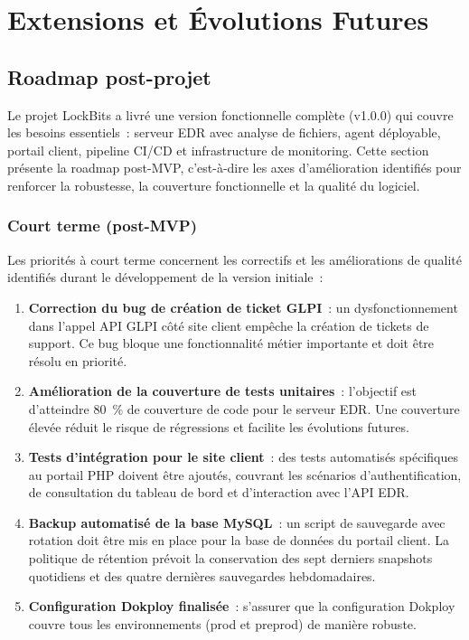 
\chapter{Extensions et Évolutions Futures}
\label{ch:extensions}

\section{Roadmap post-projet}

Le projet LockBits a livré une version fonctionnelle complète (v1.0.0) qui
couvre les besoins essentiels~: serveur EDR avec analyse de fichiers,
agent déployable, portail client, pipeline CI/CD et infrastructure de
monitoring. Cette section présente la roadmap post-MVP, c'est-à-dire les
axes d'amélioration identifiés pour renforcer la robustesse, la
couverture fonctionnelle et la qualité du logiciel.

\subsection{Court terme (post-MVP)}

Les priorités à court terme concernent les correctifs et les
améliorations de qualité identifiés durant le développement de la
version initiale~:

\begin{enumerate}
  \item \textbf{Correction du bug de création de ticket GLPI}~: un
    dysfonctionnement dans l'appel API GLPI côté site client empêche la
    création de tickets de support. Ce bug bloque une fonctionnalité
    métier importante et doit être résolu en priorité.
  \item \textbf{Amélioration de la couverture de tests unitaires}~:
    l'objectif est d'atteindre 80~\% de couverture de code pour le
    serveur EDR. Une couverture élevée réduit le risque de régressions
    et facilite les évolutions futures.
  \item \textbf{Tests d'intégration pour le site client}~: des tests
    automatisés spécifiques au portail PHP doivent être ajoutés,
    couvrant les scénarios d'authentification, de consultation du
    tableau de bord et d'interaction avec l'API EDR.
  \item \textbf{Backup automatisé de la base MySQL}~: un script de
    sauvegarde avec rotation doit être mis en place pour la base de
    données du portail client. La politique de rétention prévoit la
    conservation des sept derniers snapshots quotidiens et des quatre
    dernières sauvegardes hebdomadaires.
  \item \textbf{Configuration Dokploy finalisée}~: s'assurer que la configuration
      Dokploy couvre tous les environnements (prod et preprod) de manière robuste.
\end{enumerate}

